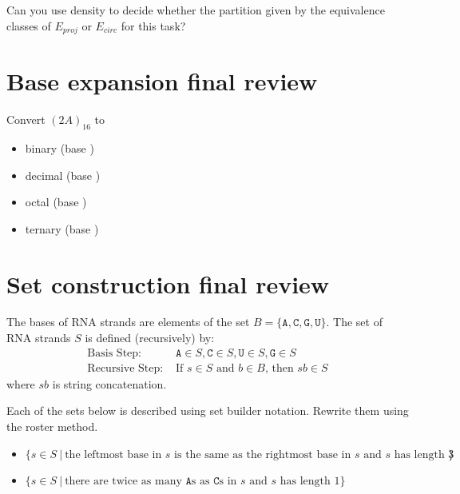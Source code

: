 \documentclass[12pt, oneside]{article}
\newcommand{\A}[0]{\texttt{A}}
\newcommand{\C}[0]{\texttt{C}}
\newcommand{\G}[0]{\texttt{G}}
\newcommand{\U}[0]{\texttt{U}}
\begin{document}
\newpage

Can you use density to decide whether the partition given by 
the equivalence classes of $E_{proj}$ or $E_{circ}$ for this task? \vfill
\section*{Base expansion final review}


Convert $(2A)_{16}$ to 
\begin{itemize}
\item binary (base \underline{\phantom{~~~2~~}})

\vspace{50pt}

\item decimal (base \underline{\phantom{~~10~~}})

\vspace{50pt}

\item octal (base \underline{\phantom{~~~8~~}})

\vspace{50pt}

\item ternary (base \underline{\phantom{~~~3~~}})

\vspace{50pt}

\end{itemize} \vfill
\section*{Set construction final review}


The bases of RNA strands are elements of the set $B = \{\A, \C, \G, \U \}$. 
The set of RNA strands $S$ is defined (recursively) by:
\[
\begin{array}{ll}
\textrm{Basis Step: } & \A \in S, \C \in S, \U \in S, \G \in S \\
\textrm{Recursive Step: } & \textrm{If } s \in S\textrm{ and }b \in B \textrm{, then }sb \in S
\end{array}
\]
where $sb$ is string concatenation.

Each of the sets below is described using set builder notation. Rewrite them using the roster method. 
\begin{itemize}
\item $\{s \in S ~|~ \text{the leftmost base in $s$ is the same as the rightmost base in $s$ and 
$s$ has length $3$} \}$ 

\vspace{50pt}

\item $\{s \in S ~|~ \text{there are twice as many $\A$s as $\C$s in $s$ and $s$ has length $1$} \}$ 

\vspace{50pt}

\end{itemize}
\end{document}
